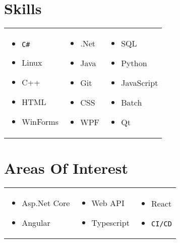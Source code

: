 \documentclass[a4paper,12pt]{article}
\begin{document}
\section{Skills}
\begin{tabular}{p{} p{} p{}}
\begin{itemize}
    \item \texttt{C\#}
    \item Linux
    \item C++
    \item HTML
    \item WinForms
\end{itemize}
&
\begin{itemize}
    \item .Net
    \item Java
    \item Git
    \item CSS
    \item WPF    
\end{itemize}
&
\begin{itemize}
    \item SQL
    \item Python
    \item JavaScript
    \item Batch
    \item Qt
\end{itemize}
\end{tabular}

\section{Areas Of Interest}
\begin{tabular}{p{} p{} p{}}
\begin{itemize}
    \item Asp.Net Core
    \item Angular
\end{itemize}
&
\begin{itemize}
    \item Web API
    \item Typescript
\end{itemize}
&
\begin{itemize}
    \item React
    \item \texttt{CI/CD}
\end{itemize}
\end{tabular}

\vfill
\end{document}
